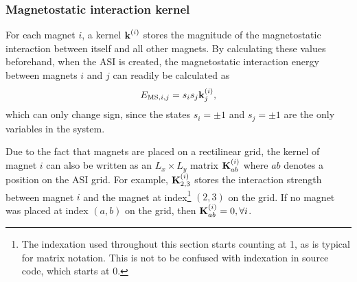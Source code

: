 \subsubsection{Magnetostatic interaction kernel}
For each magnet $i$, a kernel $\boldsymbol{\mathbf{k}}^{(i)}$ stores the magnitude of the magnetostatic interaction between itself and all other magnets.
By calculating these values beforehand, when the ASI is created, the magnetostatic interaction energy between magnets $i$ and $j$ can readily be calculated as
\begin{equation}
	E_{\mathrm{MS},i,j}= s_i s_j \boldsymbol{\mathbf{k}}^{(i)}_j \mathrm{,}
\end{equation}
which can only change sign, since the states $s_i = \pm 1$ and $s_j = \pm 1$ are the only variables in the system. \par
Due to the fact that magnets are placed on a rectilinear grid, the kernel of magnet $i$ can also be written as an $L_x \times L_y$ matrix $\boldsymbol{\mathbf{K}}^{(i)}_{ab}$ where $ab$ denotes a position on the ASI grid.
For example, $\boldsymbol{\mathbf{K}}^{(i)}_{2,3}$ stores the interaction strength between magnet $i$ and the magnet at index\footnote{The indexation used throughout this section starts counting at 1, as is typical for matrix notation. This is not to be confused with indexation in source code, which starts at 0.} $(2,3)$ on the grid.
If no magnet was placed at index $(a,b)$ on the grid, then $\boldsymbol{\mathbf{K}}^{(i)}_{ab} = 0, \forall i$. \\\par


